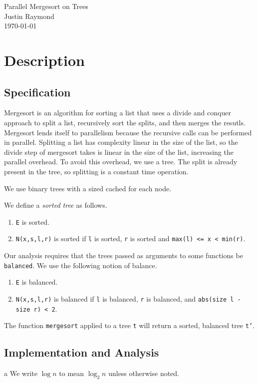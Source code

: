 \documentclass[12pt,letterpaper]{article}
\newcommand{\T}[1]{\texttt{#1}}
\begin{document}
\begin{flushright}
Parallel Mergesort on Trees\\
Justin Raymond\\
\today
\end{flushright}

\section{Description}
\subsection{Specification}
Mergesort is an algorithm for sorting a list that uses a divide and conquer approach to split a list, recursively sort the splits, and then merges the resutls.
Mergesort lends itself to parallelism because the recursive calls can be performed in parallel.
Splitting a list has complexity linear in the size of the list, so
 the divide step of mergesort takes is linear in the size of the list,
 increasing the parallel overhead.
To avoid this overhead, we use a tree.
The split is already present in the tree, so splitting is a constant time operation.

We use binary trees with a sized cached for each node.



We define a \textit{sorted tree} as follows.
\begin{enumerate}
  \item \T{E} is sorted.
  \item \T{N(x,s,l,r)} is sorted if \T{l} is sorted, \T{r} is sorted and \T{max(l) <= x < min(r)}.
\end{enumerate}

Our analysis requires that the trees passed as arguments to some functions be \T{balanced}.
We use the following notion of balance.
\begin{enumerate}
  \item \T{E} is balanced.
  \item \T{N(x,s,l,r)} is balanced if \T{l} is balanced, \T{r} is balanced, and \T{abs(size l - size r) < 2}.
\end{enumerate}

The function \T{mergesort} applied to a tree \T{t} will return a sorted, balanced tree \T{t'}.

\subsection{Implementation and Analysis}a
We write $\log n$ to mean $\log_2 n$ unless otherwise noted.
\end{document}
